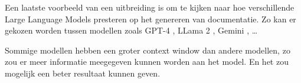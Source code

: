 Een laatste voorbeeld van een uitbreiding is om te kijken naar hoe verschillende Large Language Models presteren op het genereren van documentatie.
Zo kan er gekozen worden tussen modellen zoals GPT-4 \autocite{OpenAI2023}, LLama 2 \autocite{Meta2024}, Gemini \autocite{Google2024}, \dots

Sommige modellen hebben een groter context window dan andere modellen, zo zou er meer informatie meegegeven kunnen worden aan het model.
En het zou mogelijk een beter resultaat kunnen geven.
